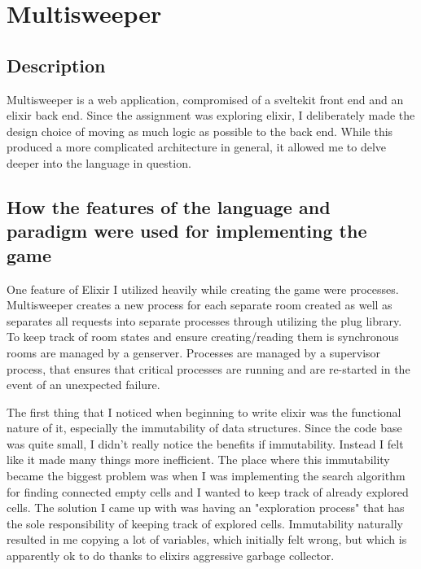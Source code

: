 
\section{Multisweeper}


\subsection{Description}
Multisweeper is a web application, compromised of a sveltekit front end and an elixir back end. Since the assignment was exploring elixir, I deliberately made the design choice of moving as much logic as possible to the back end. While this produced a more complicated architecture in general, it allowed me to delve deeper into the language in question.

\subsection{How the features of the language and paradigm were used for implementing the game}
One feature of Elixir I utilized heavily while creating the game were processes. Multisweeper creates a new process for each separate room created as well as separates all requests into separate processes through utilizing the plug library. To keep track of room states and ensure creating/reading them is synchronous rooms are managed by a genserver. Processes are managed by a supervisor process, that ensures that critical processes are running and are re-started in the event of an unexpected failure.

The first thing that I noticed when beginning to write elixir was the functional nature of it, especially the immutability of data structures. Since the code base was quite small, I didn't really notice the benefits if immutability. Instead I felt like it made many things more inefficient. The place where this immutability became the biggest problem was when I was implementing the search algorithm for finding connected empty cells and I wanted to keep track of already explored cells. The solution I came up with was having an "exploration process" that has the sole responsibility of keeping track of explored cells. Immutability naturally resulted in me copying a lot of variables, which initially felt wrong, but which is apparently ok to do thanks to elixirs aggressive garbage collector.

